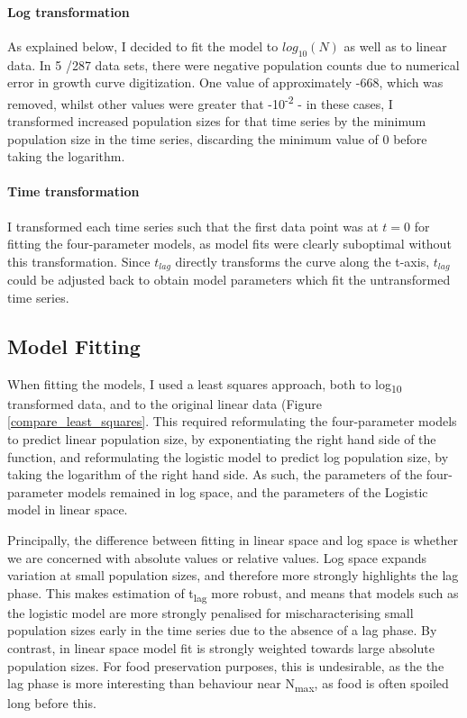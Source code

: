 \documentclass[11pt, a4paper]{article}
\begin{document}
\begin{linenumbers}
\paragraph{Log transformation}
As explained below, I decided to fit the model to $log_{10}(N)$ as well as to linear data. In 5 /287 data sets, there were negative population counts due to numerical error in growth curve digitization. One value of approximately -668, which was removed, whilst other values were greater that -10\textsuperscript{-2} - in these cases, I transformed increased population sizes for that time series by the minimum population size in the time series, discarding the minimum value of 0 before taking the logarithm.  

\paragraph{Time transformation}
I transformed each time series such that the first data point was at $t = 0$ for fitting the four-parameter models, as model fits were clearly suboptimal without this transformation. Since $t_{lag}$ directly transforms the curve along the t-axis, $t_{lag}$ could be adjusted back to obtain model parameters which fit the untransformed time series. 

\subsection{Model Fitting}
When fitting the models, I used a least squares approach, both to log\textsubscript{10} transformed data, and to the original linear data (Figure \ref{compare_least_squares}. This required reformulating the four-parameter models to predict linear population size, by exponentiating the right hand side of the function, and reformulating the logistic model to predict log population size, by taking the logarithm of the right hand side. As such, the parameters of the four-parameter models remained in log space, and the parameters of the Logistic model in linear space. 

Principally, the difference between fitting in linear space and log space is whether we are concerned with absolute values or relative values. Log space expands variation at small population sizes, and therefore more strongly highlights the lag phase. This makes estimation of t\textsubscript{lag} more robust, and means that models such as the logistic model are more strongly penalised for mischaracterising small population sizes early in the time series due to the absence of a lag phase. By contrast, in linear space model fit is strongly weighted towards large absolute population sizes. For food preservation purposes, this is undesirable, as the the lag phase is more interesting than behaviour near N\textsubscript{max}, as food is often spoiled long before this.  


\end{linenumbers}
\end{document}
